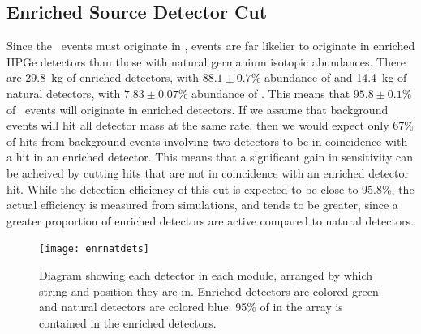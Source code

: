 \documentclass[/main.tex]{subfiles}
\begin{document}
\subsection{Enriched Source Detector Cut}
Since the \bbes\ events must originate in , events are far likelier to originate in enriched HPGe detectors than those with natural germanium isotopic abundances.
There are 29.8~kg of enriched detectors, with $88.1 \pm 0.7$\% abundance of  and 14.4~kg of natural detectors, with $7.83 \pm 0.07$\% abundance of .
This means that $95.8 \pm 0.1$\% of \bbes\ events will originate in enriched detectors.
If we assume that background events will hit all detector mass at the same rate, then we would expect only 67\% of hits from background events involving two detectors to be in coincidence with a hit in an enriched detector.
This means that a significant gain in sensitivity can be acheived by cutting hits that are not in coincidence with an enriched detector hit.
While the detection efficiency of this cut is expected to be close to 95.8\%, the actual efficiency is measured from simulations, and tends to be greater, since a greater proportion of enriched detectors are active compared to natural detectors.

\begin{figure}[h]
  \centering
  \texttt{[image: enrnatdets]}
  \caption[Module 1 and Module 2 enriched and natural detectors]{\label{fig:Ge76BBLevelDiagram}
    Diagram showing each detector in each module, arranged by which string and position they are in. Enriched detectors are colored green and natural detectors are colored blue. 95\% of  in the array is contained in the enriched detectors.}
\end{figure}
\end{document}
